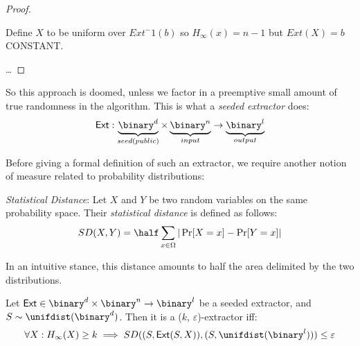 \begin{proof}
\begin{figure}[ht]
    \end{figure}

    Define $X$ to be uniform over $Ext^-1(b)$ so $H_{\infty}(x)=n-1$ but $Ext(X)=b$ CONSTANT.

    \dots

\end{proof}

So this approach is doomed, unless we factor in a preemptive small amount of true randomness in the algorithm. This is what a \emph{seeded extractor} does:
\[
    \ext: \underbrace{\binary^d}_{seed(public)}\times \underbrace{\binary^n}_{input} \to \underbrace{\binary^l}_{output}
\]

Before giving a formal definition of such an extractor, we require another notion of measure related to probability distributions:

\begin{definition} \emph{Statistical Distance}:
    Let $X$ and $Y$ be two random variables on the same probability space. Their \emph{statistical distance} is defined as follows:
    \[
        SD(X, Y) = \half\sum_{x \in \Omega}|\Pr[X = x] - \Pr[Y = x]|
    \]
    
\end{definition}

In an intuitive stance, this distance amounts to half the area delimited by the two distributions.


\begin{definition}
    Let $\ext \in \binary^d \times \binary^n \to \binary^l$ be a seeded extractor, and $S \sim \unifdist(\binary^d)$. Then it is a ($k$, $\varepsilon$)-extractor iff:
    \[
        \forall X : H_{\infty}(X) \geq k \implies SD((S, \ext(S, X)), (S, \unifdist(\binary^l))) \leq \varepsilon
    \]
\end{definition}

